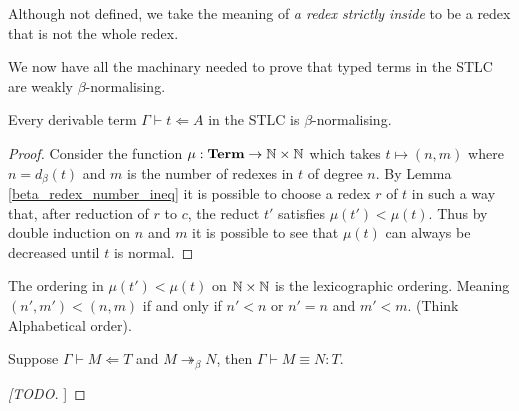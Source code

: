 \begin{remark}
    Although not defined, we take the meaning of \emph{a redex strictly inside} to be a redex that is not the whole redex.
\end{remark}

We now have all the machinary needed to prove that typed terms in the STLC are weakly $\beta$-normalising.

\begin{theorem}
    Every derivable term $\Gamma \vdash t \Leftarrow A$ in the STLC is $\beta$-normalising.
\end{theorem}

\begin{proof}
    Consider the function $\mu : \mathbf{Term} \to \mathbb{N} \times \mathbb{N}$ which takes $t \mapsto (n, m)$ where $n = d_{\beta}(t)$ and $m$ is the number of redexes in $t$ of degree $n$. By Lemma \ref{beta_redex_number_ineq} it is possible to choose a redex $r$ of $t$ in such a way that, after reduction of $r$ to $c$, the reduct $t'$ satisfies $\mu(t') < \mu(t)$. Thus by double induction on $n$ and $m$ it is possible to see that $\mu(t)$ can always be decreased until $t$ is normal.
\end{proof}

\begin{remark}
    The ordering in $\mu(t') < \mu(t)$ on $\mathbb{N} \times \mathbb{N} $ is the lexicographic ordering. Meaning $(n', m') < (n, m)$ if and only if $n' < n$ or $n'=n$ and $m' < m$. (Think Alphabetical order).
\end{remark}

\begin{lemma}
    Suppose $\Gamma \vdash M \Leftarrow T$ and $M \twoheadrightarrow_{\beta} N$, then $\Gamma \vdash M \equiv N : T$.
\end{lemma}

\begin{proof}
    [[TODO]]
\end{proof}
\begin{comment}
\begin{remark}
    Observe that by ($\equiv_{\mathsf{term}}$-tran) we can show this by induction on the definition $\twoheadrightarrow_{\beta}$. Thus it is sufficient to prove that given $\Gamma \vdash M \Leftarrow T$ and $M \to_{\beta} N$, then $\Gamma \vdash M \equiv N : T$.
\end{remark}

\begin{remark}
    This justifies our choice of rules, and shows that considering only terms strips away the typing information to no consequence.
\end{remark}
\end{comment}

